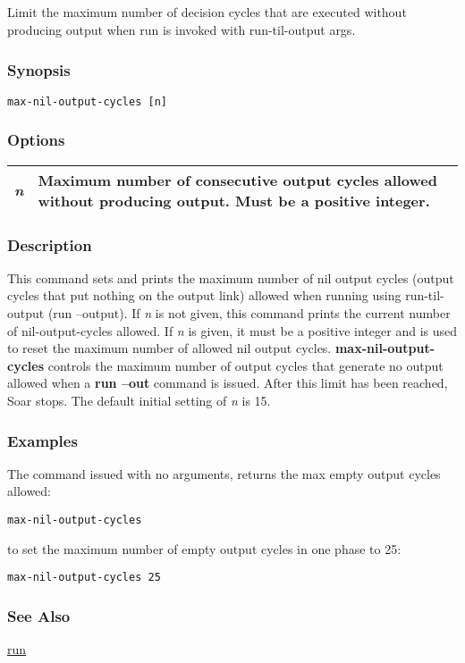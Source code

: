 \subsection{}
\label{max-nil-output-cycles}
Limit the maximum number of decision cycles that are executed without producing output when run is invoked with run-til-output args. 
\subsubsection*{Synopsis}
\begin{verbatim}
max-nil-output-cycles [n]
\end{verbatim}
\subsubsection*{Options}
\begin{tabular}{|l|l|}
\hline
\emph{n}
 & Maximum number of consecutive output cycles allowed without producing output. Must be a positive integer.  \\
\hline
\end{tabular}
\subsubsection*{Description}
 This command sets and prints the maximum number of nil output cycles (output cycles that put nothing on the output link) allowed when running using run-til-output (run --output). If \emph{n}
 is not given, this command prints the current number of nil-output-cycles allowed. If \emph{n}
 is given, it must be a positive integer and is used to reset the maximum number of allowed nil output cycles. 
 \textbf{max-nil-output-cycles}
 controls the maximum number of output cycles that generate no output allowed when a \textbf{run --out}
 command is issued. After this limit has been reached, Soar stops. The default initial setting of \emph{n}
 is 15. 
\subsubsection*{Examples}
 The command issued with no arguments, returns the max empty output cycles allowed: \begin{verbatim}
max-nil-output-cycles 
\end{verbatim}
 to set the maximum number of empty output cycles in one phase to 25: \begin{verbatim}
max-nil-output-cycles 25 
\end{verbatim}
\subsubsection*{See Also}
\hyperref[run]{run} 